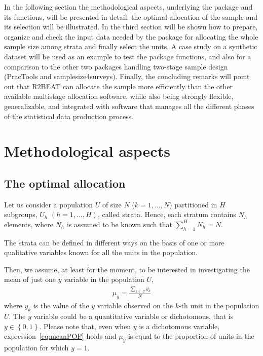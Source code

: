 In the following section the methodological aspects, underlying the package and its functions, will be presented in detail: the optimal allocation of the sample and its selection will be illustrated. 
In the third section will be shown how to prepare, organize and check the input data needed by the package for allocating the whole sample size among strata and finally select the units. 
A case study on a synthetic dataset will be used as an example to test the package functions, and also for a comparison to the other two packages handling two-stage sample design ({PracTools} and {samplesize4surveys}). 
Finally, the concluding remarks will point out that R2BEAT can allocate the sample more efficiently than the other available 
multistage allocation software, while also being strongly flexible, generalizable, and integrated with software that manages all the different phases of the statistical data production process.


\section{Methodological aspects}
\subsection{The optimal allocation}
Let us consider a population $U$ of size $N$ ($k=1, \dots, N$) partitioned in $H$ subgroups, $U_h$ $(h = 1, \dots, H)$, called strata.
Hence, each stratum contains $N_h$ elements, where $N_h$ is assumed to be known such that $\sum_{h=1}^{H} N_h = N$. 

The strata can be defined in different ways on the basis of one or more qualitative variables known for all the units in the population.

Then, we assume, at least for the moment, to be interested in investigating the mean of just one $y$ variable in the population $U$,
\begin{eqnarray}
	\label{eq:meanPOP}
	\mu_{y} = \frac{\sum_{k \in \ U} y_k}{N}
\end{eqnarray}
where $y_k$ is the value of the $y$ variable observed on the $k$-th unit in the population $U$.
The $y$ variable could be a quantitative variable or dichotomous, that is $y \in \left\lbrace 0, 1 \right\rbrace$.
Please note that, even when $y$ is a dichotomous variable, expression~\eqref{eq:meanPOP} holds and $\mu_{y}$ is equal to the proportion of units in the population for which $y=1$.

